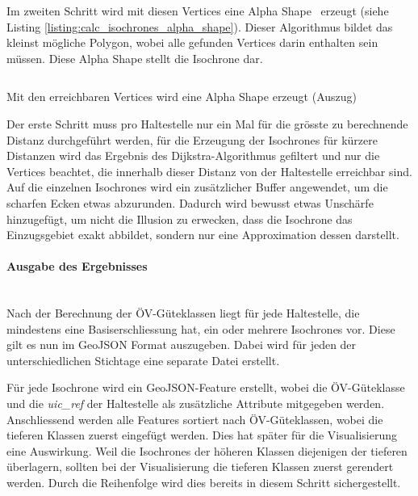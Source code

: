 Im zweiten Schritt wird mit diesen Vertices eine Alpha Shape~\cite{alpha_shapes} erzeugt (siehe Listing \ref{listing:calc_isochrones_alpha_shape}). Dieser Algorithmus bildet das kleinst mögliche Polygon, wobei alle gefunden Vertices darin enthalten sein müssen.
Diese Alpha Shape stellt die \gls{Isochrone} dar.

\begin{listing}[ht]
    \inputminted{sql}{projectdoc/listing/calc_isochrones_alpha_shape.sql}
    \caption[Berechnung der Alpha Shape]{Mit den erreichbaren Vertices wird eine Alpha Shape erzeugt (Auszug)}
    \label{listing:calc_isochrones_alpha_shape}
\end{listing}

Der erste Schritt muss pro Haltestelle nur ein Mal für die grösste zu berechnende Distanz durchgeführt werden, für die Erzeugung der \glspl{Isochrone} für kürzere Distanzen wird das Ergebnis des Dijkstra-Algorithmus gefiltert und nur die Vertices beachtet, die innerhalb dieser Distanz von der Haltestelle erreichbar sind.
Auf die einzelnen \glspl{Isochrone} wird ein zusätzlicher Buffer angewendet, um die scharfen Ecken etwas abzurunden.
Dadurch wird bewusst etwas Unschärfe hinzugefügt, um nicht die Illusion zu erwecken, dass die \gls{Isochrone} das Einzugsgebiet exakt abbildet, sondern nur eine Approximation dessen darstellt.

\paragraph{Ausgabe des Ergebnisses}~\\
Nach der Berechnung der \acs{ÖV}-Güteklassen liegt für jede Haltestelle, die mindestens eine Basiserschliessung hat, ein oder mehrere \glspl{Isochrone} vor.
Diese gilt es nun im GeoJSON Format auszugeben.
Dabei wird für jeden der unterschiedlichen Stichtage eine separate Datei erstellt.

Für jede \gls{Isochrone} wird ein GeoJSON-Feature erstellt, wobei die \acs{ÖV}-Güteklasse und die \emph{uic\_ref} der Haltestelle als zusätzliche Attribute mitgegeben werden.
Anschliessend werden alle Features sortiert nach \acs{ÖV}-Güteklassen, wobei die tieferen Klassen zuerst eingefügt werden.
Dies hat später für die Visualisierung eine Auswirkung.
Weil die \glspl{Isochrone} der höheren Klassen diejenigen der tieferen überlagern, sollten bei der Visualisierung die tieferen Klassen zuerst gerendert werden.
Durch die Reihenfolge wird dies bereits in diesem Schritt sichergestellt.

